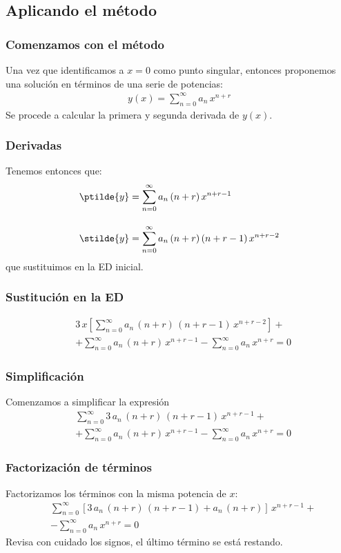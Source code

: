 \subsection{Aplicando el método}
\begin{frame}
\frametitle{Comenzamos con el método}
Una vez que identificamos a $x = 0$ como punto singular, entonces proponemos una solución en términos de una serie de potencias:
\begin{align*}
y(x) = \sum_{n=0}^{\infty} a_{n} \, x^{n+r}
\end{align*}
\pause
Se procede a calcular la primera y segunda derivada de $y(x)$.
\end{frame}
\begin{frame}
\frametitle{Derivadas}
Tenemos entonces que:
\begin{align*}
\ptilde{y} &= \sum_{n=0}^{\infty} a_{n} \, (n + r) \, x^{n+r-1} \\[1em]
\stilde{y} &= \sum_{n=0}^{\infty} a_{n} \, (n + r) \, (n+ r - 1) \, x^{n+r-2}
\end{align*}
que sustituimos en la ED inicial.
\end{frame}
\begin{frame}
\frametitle{Sustitución en la ED}
\begin{align*}
&3 \, x \left[ \sum_{n=0}^{\infty} a_{n} \, (n + r) \, (n+ r - 1) \, x^{n+r-2} \right] + \\[0.5em]
&+ \sum_{n=0}^{\infty} a_{n} \, (n + r) \, x^{n+r-1} - \sum_{n=0}^{\infty} a_{n} \, x^{n+r} = 0
\end{align*}
\end{frame}
\begin{frame}
\frametitle{Simplificación}
Comenzamos a simplificar la expresión
\begin{align*}
&\sum_{n=0}^{\infty} 3 \, a_{n} \, (n + r) \, (n+ r - 1) \, x^{n+r-1} + \\[0.5em]
&+ \sum_{n=0}^{\infty} a_{n} \, (n + r) \, x^{n+r-1} - \sum_{n=0}^{\infty} a_{n} \, x^{n+r} = 0
\end{align*}
\end{frame}
\begin{frame}
\frametitle{Factorización de términos}
Factorizamos los términos con la misma potencia de $x$:
\begin{align*}
&\sum_{n=0}^{\infty} \left[  3 \, a_{n} \, (n + r) \, (n+ r - 1) + a_{n} \, (n + r) \right] \, x^{n+r-1} + \\[0.5em]
&- \sum_{n=0}^{\infty} a_{n} \, x^{n+r} = 0
\end{align*}
\fontsize{12}{12}\selectfont
Revisa con cuidado los signos, el último término se está restando.
\end{frame}
